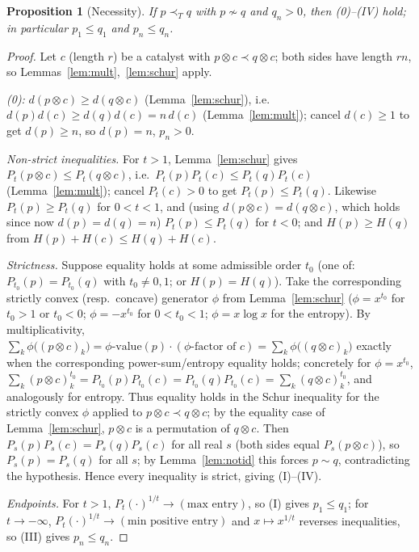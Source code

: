 \documentclass{amsart}
\theoremstyle{plain}
\newtheorem{proposition}{Proposition}
\theoremstyle{definition}
\newcommand{\maj}{\prec}
\newcommand{\trump}{\prec_T}
\begin{document}
\begin{proposition}[Necessity]\label{prop:nec}
If $p\trump q$ with $p\not\sim q$ and $q_n>0$, then \textnormal{(0)--(IV)} hold; in
particular $p_1\le q_1$ and $p_n\le q_n$.
\end{proposition}
\begin{proof}
Let $c$ (length $r$) be a catalyst with $p\otimes c\maj q\otimes c$; both sides have
length $rn$, so Lemmas~\ref{lem:mult},~\ref{lem:schur} apply.

\emph{(0):} $d(p\otimes c)\ge d(q\otimes c)$ (Lemma~\ref{lem:schur}), i.e.\
$d(p)d(c)\ge d(q)d(c)=n\,d(c)$ (Lemma~\ref{lem:mult}); cancel $d(c)\ge1$ to get
$d(p)\ge n$, so $d(p)=n$, $p_n>0$.

\emph{Non-strict inequalities.} For $t>1$, Lemma~\ref{lem:schur} gives
$P_t(p\otimes c)\le P_t(q\otimes c)$, i.e.\ $P_t(p)P_t(c)\le P_t(q)P_t(c)$
(Lemma~\ref{lem:mult}); cancel $P_t(c)>0$ to get $P_t(p)\le P_t(q)$. Likewise
$P_t(p)\ge P_t(q)$ for $0<t<1$, and (using $d(p\otimes c)=d(q\otimes c)$, which holds
since now $d(p)=d(q)=n$) $P_t(p)\le P_t(q)$ for $t<0$; and $H(p)\ge H(q)$ from
$H(p)+H(c)\le H(q)+H(c)$.

\emph{Strictness.} Suppose equality holds at some admissible order $t_0$ (one of:
$P_{t_0}(p)=P_{t_0}(q)$ with $t_0\ne0,1$; or $H(p)=H(q)$). Take the corresponding
strictly convex (resp.\ concave) generator $\phi$ from Lemma~\ref{lem:schur}
($\phi=x^{t_0}$ for $t_0>1$ or $t_0<0$; $\phi=-x^{t_0}$ for $0<t_0<1$;
$\phi=x\log x$ for the entropy). By multiplicativity,
$\sum_k\phi\big((p\otimes c)_k\big)=\phi\text{-value}(p)\cdot(\text{$\phi$-factor of }c)
=\sum_k\phi\big((q\otimes c)_k\big)$ exactly when the corresponding power-sum/entropy
equality holds; concretely for $\phi=x^{t_0}$,
$\sum_k(p\otimes c)_k^{t_0}=P_{t_0}(p)P_{t_0}(c)=P_{t_0}(q)P_{t_0}(c)
=\sum_k(q\otimes c)_k^{t_0}$, and analogously for entropy. Thus equality holds in the
Schur inequality for the strictly convex $\phi$ applied to $p\otimes c\maj q\otimes c$;
by the equality case of Lemma~\ref{lem:schur}, $p\otimes c$ is a permutation of
$q\otimes c$. Then $P_s(p)P_s(c)=P_s(q)P_s(c)$ for all real $s$ (both sides equal
$P_s(p\otimes c)$), so $P_s(p)=P_s(q)$ for all $s$; by Lemma~\ref{lem:notid} this
forces $p\sim q$, contradicting the hypothesis. Hence every inequality is strict,
giving (I)--(IV).

\emph{Endpoints.} For $t>1$, $P_t(\cdot)^{1/t}\to(\text{max entry})$, so (I) gives
$p_1\le q_1$; for $t\to-\infty$, $P_t(\cdot)^{1/t}\to(\text{min positive entry})$ and
$x\mapsto x^{1/t}$ reverses inequalities, so (III) gives $p_n\le q_n$.
\end{proof}
\end{document}
